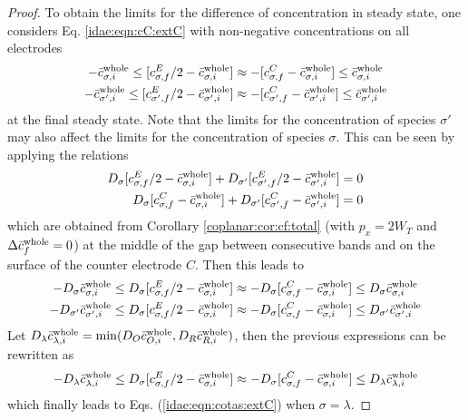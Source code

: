 \begin{proof}
	To obtain the limits for the difference of concentration in steady state,
	one considers Eq. \eqref{idae:eqn:cC:extC} with non-negative concentrations on all electrodes
	\begin{subequations}
		\begin{align}
		-\bar{c}_{\sigma,i}^{\text{whole}}
		\leq [c_{\sigma,f}^{E}/2 - \bar{c}_{\sigma,i}^{\text{whole}}]
		&\approx -[c_{\sigma,f}^{C} - \bar{c}_{\sigma,i}^{\text{whole}}]
		\leq \bar{c}_{\sigma,i}^{\text{whole}}
		\\
		-\bar{c}_{\sigma',i}^{\text{whole}}
		\leq [c_{\sigma',f}^{E}/2 - \bar{c}_{\sigma',i}^{\text{whole}}]
		&\approx -[c_{\sigma',f}^{C} - \bar{c}_{\sigma',i}^{\text{whole}}]
		\leq \bar{c}_{\sigma',i}^{\text{whole}}
		\end{align}
	\end{subequations}
	at the final steady state. Note that the limits for the concentration of species $\sigma'$ may also affect
	the limits for the concentration of species $\sigma$.
	This can be seen by applying the relations
	\begin{subequations}
		\label{idae:eqn:cf:whole:total}
		\begin{align}
			D_{\sigma} [c_{\sigma,f}^{E}/2 - \bar{c}_{\sigma,i}^{\text{whole}}]
			+ D_{\sigma'} [c_{\sigma',f}^{E}/2 - \bar{c}_{\sigma',i}^{\text{whole}}] &= 0
			\\
			D_{\sigma} [c_{\sigma,f}^{C} - \bar{c}_{\sigma,i}^{\text{whole}}]
			+ D_{\sigma'} [c_{\sigma',f}^{C} - \bar{c}_{\sigma',i}^{\text{whole}}] &= 0
		\end{align}
	\end{subequations}
	which are obtained from Corollary \ref{coplanar:cor:cf:total}
	(with $p_{x} = 2W_{T}$ and $\Delta\bar{c}_{f}^{\text{whole}} = 0$)
	at the middle of the gap between consecutive bands and on the surface of the counter electrode $C$.
	Then this leads to
	\begin{subequations}
		\begin{align}
		-D_{\sigma} \bar{c}_{\sigma,i}^{\text{whole}}
		\leq D_{\sigma} [c_{\sigma,f}^{E}/2 - \bar{c}_{\sigma,i}^{\text{whole}}]
		&\approx -D_{\sigma} [c_{\sigma,f}^{C} - \bar{c}_{\sigma,i}^{\text{whole}}]
		\leq D_{\sigma} \bar{c}_{\sigma,i}^{\text{whole}}
		\\
		-D_{\sigma'} \bar{c}_{\sigma',i}^{\text{whole}}
		\leq D_{\sigma} [c_{\sigma,f}^{E}/2 - \bar{c}_{\sigma,i}^{\text{whole}}]
		&\approx -D_{\sigma} [c_{\sigma,f}^{C} - \bar{c}_{\sigma,i}^{\text{whole}}]
		\leq D_{\sigma'} \bar{c}_{\sigma',i}^{\text{whole}}
		\end{align}
	\end{subequations}
	Let $D_{\lambda} \bar{c}_{\lambda,i}^{\text{whole}} = \min(D_{O} \bar{c}_{O,i}^{\text{whole}}, D_{R} \bar{c}_{R,i}^{\text{whole}})$,
	then the previous expressions can be rewritten as
	\begin{equation}
		\label{idae:eqn:cotas:compacto}
		-D_{\lambda} \bar{c}_{\lambda,i}^{\text{whole}}
		\leq D_{\sigma} [c_{\sigma,f}^{E}/2 - \bar{c}_{\sigma,i}^{\text{whole}}]
		\approx -D_{\sigma} [c_{\sigma,f}^{C} - \bar{c}_{\sigma,i}^{\text{whole}}]
		\leq D_{\lambda} \bar{c}_{\lambda,i}^{\text{whole}}
	\end{equation}
	which finally leads to Eqs. (\ref{idae:eqn:cotas:extC}) when $\sigma = \lambda$.
	

\end{proof}
